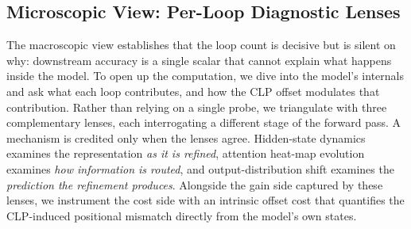 \subsection{Microscopic View: Per-Loop Diagnostic Lenses}
\label{sec:exp-micro}
The macroscopic view establishes that the loop count is decisive but is
silent on why: downstream accuracy is a single scalar that cannot explain
what happens inside the model.
To open up the computation, we dive into the model's internals and ask what
each loop contributes, and how the CLP offset modulates that
contribution.
Rather than relying on a single probe, we triangulate with three complementary
lenses, each interrogating a different stage of the forward pass.
A mechanism is credited only when the lenses agree.
Hidden-state dynamics examines the
representation \emph{as it is refined}, attention heat-map evolution examines
\emph{how information is routed}, and output-distribution shift examines the
\emph{prediction the refinement produces}.
Alongside the gain side captured by these lenses, we instrument the cost side
with an intrinsic offset cost that quantifies the CLP-induced positional
mismatch directly from the model's own states.


